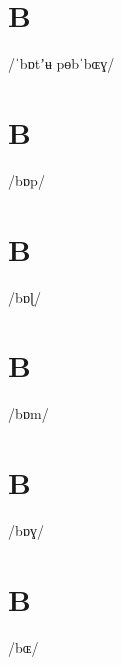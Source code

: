 \documentclass[10pt,a4paper,twoside]{book}
\begin{document}
\section*{B}

\begin{multicols}{3}
 {/ˈbɒtʼʉ pɵbˈbɶɣ/} {}
\end{multicols}

\section*{B}

\begin{multicols}{3}
 {/bɒp/} {}
\end{multicols}

\section*{B}

\begin{multicols}{3}
 {/bɒɭ/} {}
\end{multicols}

\section*{B}

\begin{multicols}{3}
 {/bɒm/} {}
\end{multicols}

\section*{B}

\begin{multicols}{3}
 {/bɒɣ/} {}
\end{multicols}

\section*{B}

\begin{multicols}{3}
 {/bɶ/} {}
\end{multicols}
\end{document}
